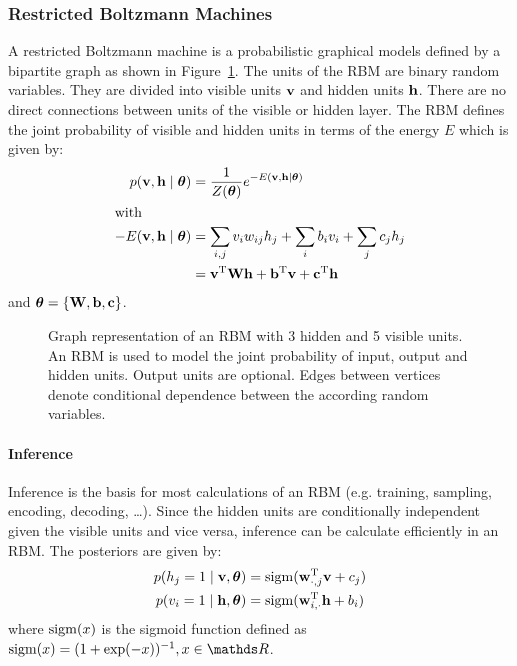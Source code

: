 \documentclass{report}
\begin{document}
\subsubsection{Restricted Boltzmann Machines}

A restricted Boltzmann machine is a probabilistic graphical models defined by a
bipartite graph as shown in Figure~\ref{fig:rbm}. The units of the RBM are
binary random variables. They are divided into visible units $\mathbf{v}$ and
hidden units $\mathbf{h}$. There are no direct connections between units of the
visible or hidden layer. The RBM defines the joint probability of visible and
hidden units in terms of the energy $E$ which is given by:
\begin{align}
p(\mathbf{v}, \mathbf{h} \mid \boldsymbol{\theta}) &=
\frac{1}{Z(\boldsymbol{\theta})}e^{-E(\mathbf{v}, \mathbf{h} \mid
\boldsymbol{\theta})} \\
\intertext{with}
-E(\mathbf{v}, \mathbf{h}\mid \boldsymbol{\theta}) &= \sum_{i, j}v_i w_{ij} h_j +
\sum_i b_i v_i + \sum_j c_j h_j \\
&= \mathbf{v}^\textup{T}\mathbf{W}\mathbf{h} + \mathbf{b}^\textup{T}\mathbf{v} +
\mathbf{c}^\textup{T}\mathbf{h}
\end{align}
and $\boldsymbol{\theta} = \{\mathbf{W}, \mathbf{b}, \mathbf{c}\}$.
\begin{figure}
\centering

\caption{Graph representation of an RBM with 3 hidden and 5 visible units.
  An RBM is used to model the joint probability of input, output and hidden units.
  Output units are optional. Edges between vertices denote conditional
  dependence between the according random variables.}
\label{fig:rbm}
\end{figure}

\paragraph{Inference}
Inference is the basis for most calculations of an RBM (e.g. training, sampling,
encoding, decoding, \dots). Since the hidden units are conditionally independent
given the visible units and vice versa, inference can be calculate efficiently
in an RBM. The posteriors are given by:
\begin{align}
\label{eq:hgivenv}
p(h_j = 1 \mid \mathbf{v}, \boldsymbol{\theta}) &= \operatorname{sigm}(\mathbf{w}_{\cdot,j}^\text{T}\mathbf{v}
+ c_j)\\
\label{eq:vgivenh}
p(v_i = 1 \mid \mathbf{h}, \boldsymbol{\theta}) &= \operatorname{sigm}(\mathbf{w}_{i,
\cdot}^\text{T}\mathbf{h} + b_i)
\end{align}
where $\operatorname{sigm}(x)$ is the sigmoid function defined as $\sigm(x) = (1+
\exp(-x))^{-1}, x \in \R$.
\end{document}
